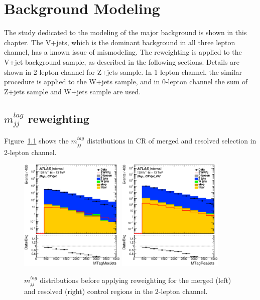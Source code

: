 \chapter{Background Modeling}
\label{chap:modeling}

The study dedicated to the modeling of the major background is shown in this chapter.
The V+jets, which is the dominant background in all three lepton channel, has a known issue of mismodeling. 
The reweighting is applied to the V+jet background sample, as described in the following sections.
Details are shown in 2-lepton channel for Z+jets sample. 
In 1-lepton channel, the similar procedure is applied to the W+jets sample, and in 0-lepton channel the sum of Z+jets sample and W+jets sample are used.

\section{$m_{jj}^{tag}$ reweighting}
Figure~\ref{fig:2lep_mtag_before_rw} shows the $m^{tag}_{jj}$ distributions in CR of merged and resolved selection in 2-lepton channel.

\begin{figure}[ht]
    \centering
    \includegraphics[width=0.45\textwidth]{figures/2lep/reweighting/before_reweighting/C_0ptag1pfat0pjet_0ptv_CRVjet_MTagMerJets_Log.eps}
    \includegraphics[width=0.45\textwidth]{figures/2lep/reweighting/before_reweighting/C_0ptag2pjet_0ptv_CRVjet_Fid_MTagResJets_Log.eps}
    \caption{ $m^{tag}_{jj}$ distributions before applying reweighting for the merged (left) and resolved (right) control regions in the 2-lepton channel.}
    \label{fig:2lep_mtag_before_rw}
\end{figure}

